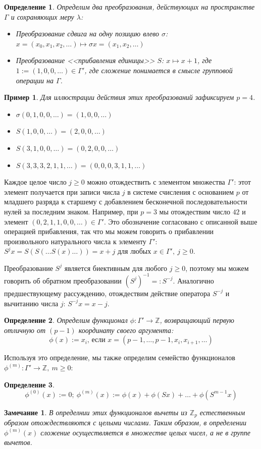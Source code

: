 \documentclass[14pt, a4paper, russian]{report}
\newtheorem{remark}{\indent Замечание}
\newtheorem{definition}{\indent Определение}
\newtheorem{example}{\indent Пример}
\begin{document}
\begin{definition} Определим два преобразования, действующих на пространстве $\Gamma$ и сохраняющих меру $\lambda$:
\begin{itemize}
\item Преобразование сдвига на одну позицию влево $\sigma$: $x=\left(x_0, x_1, x_2, \ldots \right) \mapsto \sigma x = \left(x_1, x_2, \ldots \right)$
\item Преобразование <<прибавления единицы>> $S$: $x \mapsto x + 1$, где $1:=(1,0,0,\ldots) \in \Gamma'$, где сложение понимается в смысле групповой операции на $\Gamma$. 
\end{itemize}
\end{definition}
\begin{example}
Для иллюстрации действия этих преобразований зафиксируем $p=4$. 
\begin{itemize}
\item $\sigma (0,1,0,0,\ldots) = (1, 0, 0, \ldots)$
\item $S(1,0,0,\ldots) = (2,0,0,\ldots)$
\item $S(3,1,0,0,\ldots) = (0,2,0,0,\ldots)$
\item $S(3,3,3,2,1,1,\ldots)=(0,0,0,3,1,1,\ldots)$
\end{itemize}
\end{example}

Каждое целое число $j \ge 0$ можно отождествить с элементом множества $\Gamma'$: этот элемент получается при записи числа $j$ в системе счисления с основанием $p$ от младшего разряда к старшему с добавлением бесконечной последовательности нулей за последним знаком. Например, при $p=3$ мы отождествим число $42$ и элемент $(0,2,1,1,0,0,\ldots) \in \Gamma'$. Это обозначение согласовано с описанной выше операцией прибавления, так что мы можем говорить о прибавлении произвольного натурального числа к элементу $\Gamma'$: $S^j x = S(S(\ldots S(x)\ldots)) = x + j$ для любых $x \in \Gamma',\ j \ge 0$.

Преобразование $S^j$ является биективным для любого $j \ge 0$, поэтому мы можем говорить об обратном преобразовании $(S^j)^{-1} =: S^{-j}$. Аналогично предшествующему рассуждению, отождествим действие оператора $S^{-j}$ и вычитанию числа $j$: $S^{-j} x = x - j$.

\begin{definition}\label{phi}
Определим функционал $\phi: \Gamma' \to \mathbb{Z}$, возвращающий первую отличную от $(p-1)$ координату своего аргумента:
 \[\phi(x):=x_i\text{, если }x=(p-1, \ldots, p-1, x_i, x_{i+1}, \ldots)\]
\end{definition}
 Используя это определение, мы также определим семейство функционалов $\phi^{(m)}: \Gamma' \to \mathbb{Z},\ m \ge 0$:
\begin{definition}\label{phi_m}
    \[\phi^{(0)}(x):=0;\ \phi^{(m)}(x):=\phi(x)+\phi(Sx)+\ldots+\phi(S^{m-1}x)\]
\end{definition}
\begin{remark}
В определнии этих функционалов вычеты из $\mathbb{Z}_p$ естественным образом отождествляются с целыми числами. Таким образом, в определении $\phi^{(m)}(x)$ сложение осуществляется в множестве целых чисел, а не в группе вычетов.
\end{remark}
\end{document}

